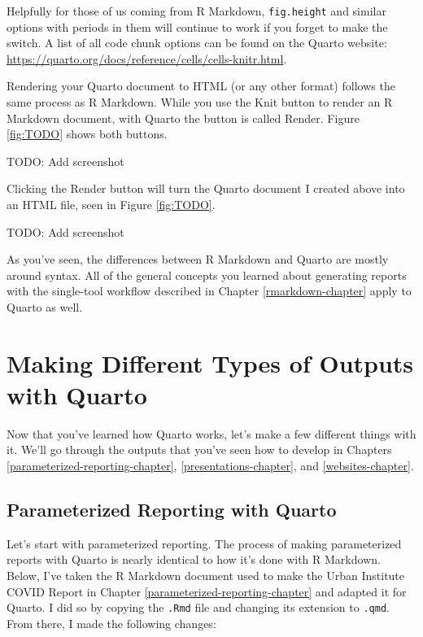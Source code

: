 \documentclass[
]{book}
\begin{document}
Helpfully for those of us coming from R Markdown, \texttt{fig.height} and similar options with periods in them will continue to work if you forget to make the switch. A list of all code chunk options can be found on the Quarto website: \url{https://quarto.org/docs/reference/cells/cells-knitr.html}.

Rendering your Quarto document to HTML (or any other format) follows the same process as R Markdown. While you use the Knit button to render an R Markdown document, with Quarto the button is called Render. Figure \ref{fig:TODO} shows both buttons.

TODO: Add screenshot

Clicking the Render button will turn the Quarto document I created above into an HTML file, seen in Figure \ref{fig:TODO}.

TODO: Add screenshot

As you've seen, the differences between R Markdown and Quarto are mostly around syntax. All of the general concepts you learned about generating reports with the single-tool workflow described in Chapter \ref{rmarkdown-chapter} apply to Quarto as well.

\hypertarget{making-different-types-of-outputs-with-quarto}{%
\section*{Making Different Types of Outputs with Quarto}\label{making-different-types-of-outputs-with-quarto}}

Now that you've learned how Quarto works, let's make a few different things with it. We'll go through the outputs that you've seen how to develop in Chapters \ref{parameterized-reporting-chapter}, \ref{presentations-chapter}, and \ref{websites-chapter}.

\hypertarget{parameterized-reporting-with-quarto}{%
\subsection*{Parameterized Reporting with Quarto}\label{parameterized-reporting-with-quarto}}

Let's start with parameterized reporting. The process of making parameterized reports with Quarto is nearly identical to how it's done with R Markdown. Below, I've taken the R Markdown document used to make the Urban Institute COVID Report in Chapter \ref{parameterized-reporting-chapter} and adapted it for Quarto. I did so by copying the \texttt{.Rmd} file and changing its extension to \texttt{.qmd}. From there, I made the following changes:
\end{document}
